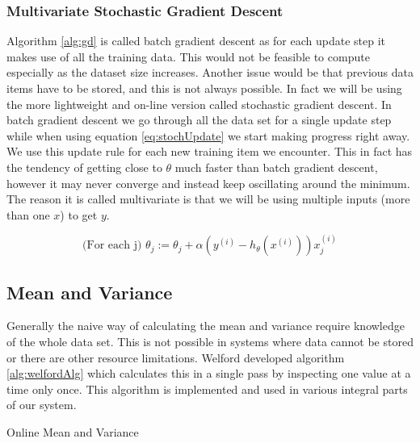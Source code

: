 \documentclass{mproj}
\begin{document}
\subsubsection{Multivariate Stochastic Gradient Descent}
Algorithm \ref{alg:gd} is called batch gradient descent as for each update step it makes use of all the training data. This would not be feasible to compute especially as the dataset size increases. Another issue would be that previous data items have to be stored, and this is not always possible. In fact we will be using the more lightweight and on-line version called stochastic gradient descent. In batch gradient descent we go through all the data set for a single update step while when using equation \ref{eq:stochUpdate} we start making progress right away. We use this update rule for each new training item we encounter. This in fact has the tendency of getting close to $\theta$ much faster than batch gradient descent, however it may never converge and instead keep oscillating around the minimum. The reason it is called multivariate is that we will be using multiple inputs (more than one $x$) to get $y$.

\begin{equation}
\label{eq:stochUpdate}
\text{(For each j) }\theta_j := \theta_j + \alpha(y^{(i)}-h_\theta(x^{(i)}))x_j^{(i)}
\end{equation}

\subsection{Mean and Variance}
\label{sec:meanvariance}
Generally the naive way of calculating the mean and variance require knowledge of the whole data set. This is not possible in systems where data cannot be stored or there are other resource limitations. Welford \cite{meanvariance} developed algorithm \ref{alg:welfordAlg} which calculates this in a single pass by inspecting one value at a time only once. This algorithm is implemented and used in various integral parts of our system.

\begin{algorithm}[H]
\caption{Online Mean and Variance \cite{meanvariance}}
\label{alg:welfordAlg}
\end{algorithm}
\end{document}
